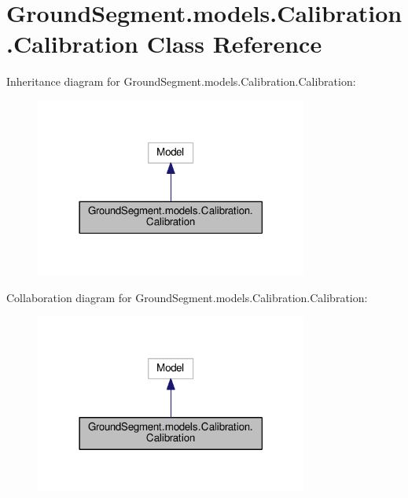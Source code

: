 \hypertarget{class_ground_segment_1_1models_1_1_calibration_1_1_calibration}{}\section{Ground\+Segment.\+models.\+Calibration.\+Calibration Class Reference}
\label{class_ground_segment_1_1models_1_1_calibration_1_1_calibration}


Inheritance diagram for Ground\+Segment.\+models.\+Calibration.\+Calibration\+:\nopagebreak
\begin{figure}[H]
\begin{center}
\leavevmode
\includegraphics[width=254pt]{class_ground_segment_1_1models_1_1_calibration_1_1_calibration__inherit__graph}
\end{center}
\end{figure}


Collaboration diagram for Ground\+Segment.\+models.\+Calibration.\+Calibration\+:\nopagebreak
\begin{figure}[H]
\begin{center}
\leavevmode
\includegraphics[width=254pt]{class_ground_segment_1_1models_1_1_calibration_1_1_calibration__coll__graph}
\end{center}
\end{figure}
